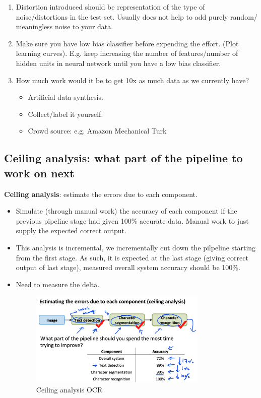 \begin{enumerate}
    \item Distortion introduced should be representation of the type of noise/distortions in the test set. Usually does not help to add purely random/ meaningless noise to your data. 
    \item Make sure you have low bias classifier before expending the effort. (Plot learning curves). E.g. keep increasing the number of features/number of hidden units in neural network until you have a low bias classifier. 
    \item How much work would it be to get 10x as much data as we currently have? 
            \begin{itemize}
                \item Artificial data synthesis.
                \item Collect/label it yourself.
                \item Crowd source: e.g. Amazon Mechanical Turk
            \end{itemize}
\end{enumerate}


\subsection{Ceiling analysis: what part of the pipeline to work on next}
    \textbf{Ceiling analysis}: estimate the errors due to each component.
\begin{itemize}
    \item Simulate (through manual work) the accuracy of each component if the previous pipeline stage had given 100\% accurate data. Manual work to just supply the expected correct output. 
    \item This analysis is incremental, we incrementally cut down the pilpeline starting from the first stage. As such, it is expected at the last stage (giving correct output of last stage), measured overall system accuracy should be 100\%.
    \item Need to measure the delta.

        \begin{figure}[htpb]
            \centering
            \includegraphics[width=0.8\textwidth]{image/ceiling-analysis.png}
            \caption{Ceiling analysis OCR}
            \label{fig:ceiling-analysis}
        \end{figure}
\end{itemize}
